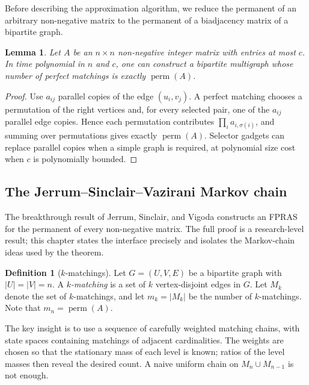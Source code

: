 \documentclass[twoside,12pt]{book}
\theoremstyle{plain}
\newtheorem{lemma}[theorem]{Lemma}
\theoremstyle{definition}
\newtheorem{definition}[theorem]{Definition}
\theoremstyle{remark}
\begin{document}
Before describing the approximation algorithm, we reduce the permanent of an arbitrary non-negative matrix to the permanent of a biadjacency matrix of a bipartite graph.

\begin{lemma}
\label{lem:perm-reduction}
Let $A$ be an $n \times n$ non-negative integer matrix with entries at most
$c$. In time polynomial in $n$ and $c$, one can construct a bipartite
multigraph whose number of perfect matchings is exactly $\operatorname{perm}(A)$.
\end{lemma}

\begin{proof}
Use $a_{ij}$ parallel copies of the edge $(u_i,v_j)$. A perfect matching
chooses a permutation of the right vertices and, for every selected pair,
one of the $a_{ij}$ parallel edge copies. Hence each permutation contributes
$\prod_i a_{i,\sigma(i)}$, and summing over permutations gives exactly
$\operatorname{perm}(A)$. Selector gadgets can replace parallel copies when a
simple graph is required, at polynomial size cost when $c$ is polynomially
bounded.
\end{proof}

\subsection{The Jerrum--Sinclair--Vazirani Markov chain}

The breakthrough result of Jerrum, Sinclair, and Vigoda constructs an FPRAS
for the permanent of every non-negative matrix. The full proof is a
research-level result; this chapter states the interface precisely and
isolates the Markov-chain ideas used by the theorem.

\begin{definition}[$k$-matchings]
Let $G = (U, V, E)$ be a bipartite graph with $|U| = |V| = n$. A \emph{$k$-matching} is a set of $k$ vertex-disjoint edges in $G$. Let $M_k$ denote the set of $k$-matchings, and let $m_k = |M_k|$ be the number of $k$-matchings. Note that $m_n = \operatorname{perm}(A)$.
\end{definition}

The key insight is to use a sequence of carefully weighted matching chains,
with state spaces containing matchings of adjacent cardinalities. The weights
are chosen so that the stationary mass of each level is known; ratios of the
level masses then reveal the desired count. A naive uniform chain on
$M_n\cup M_{n-1}$ is not enough.
\end{document}
